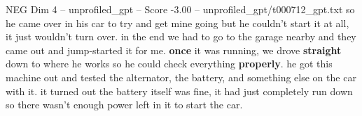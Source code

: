 \begin{textsample}{NEG Dim 4 – unprofiled\_gpt – Score -3.00 – unprofiled\_gpt/t000712\_gpt.txt}  \label{ex:f4_neg_029}
so he came over in his car to try and get mine going but he couldn't start it at all, it just wouldn't turn over. in the end we had to go to the garage nearby and they came out and jump-started it for me. \textbf{once} it was running, we drove \textbf{straight} down to where he works so he could check everything \textbf{properly}. he got this machine out and tested the alternator, the battery, and something else on the car with it. it turned out the battery itself was fine, it had just completely run down so there wasn't enough power left in it to start the car.

\end{textsample}
